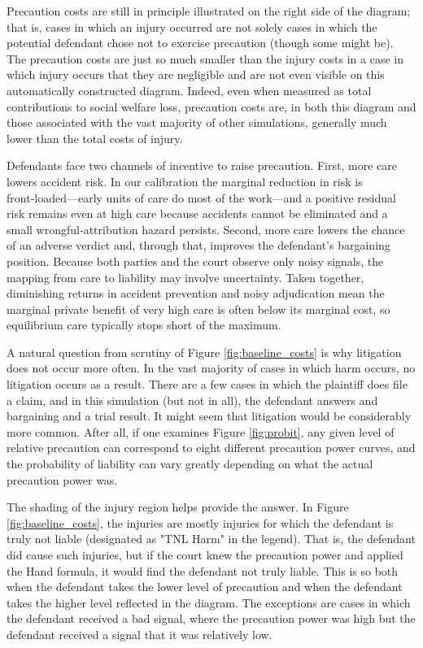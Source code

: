 \documentclass{article}
\begin{document}
Precaution costs are still in principle illustrated on the right side of the diagram; that is, cases in which an injury occurred are not solely cases in which the potential defendant chose not to exercise precaution (though some might be). The precaution costs are just so much smaller than the injury costs in a case in which injury occurs that they are negligible and are not even visible on this automatically constructed diagram. Indeed, even when measured as total contributions to social welfare loss, precaution costs are, in both this diagram and those associated with the vast majority of other simulations, generally much lower than the total costs of injury. 

Defendants face two channels of incentive to raise precaution. First, more care lowers accident risk. In our calibration the marginal reduction in risk is front‑loaded—early units of care do most of the work—and a positive residual risk remains even at high care because accidents cannot be eliminated and a small wrongful‑attribution hazard persists. Second, more care lowers the chance of an adverse verdict and, through that, improves the defendant’s bargaining position. Because both parties and the court observe only noisy signals, the mapping from care to liability may involve uncertainty. Taken together, diminishing returns in accident prevention and noisy adjudication mean the marginal private benefit of very high care is often below its marginal cost, so equilibrium care typically stops short of the maximum.

A natural question from scrutiny of Figure \ref{fig:baseline_costs} is why litigation does not occur more often. In the vast majority of cases in which harm occurs, no litigation occurs as a result. There are a few cases in which the plaintiff does file a claim, and in this simulation (but not in all), the defendant answers and bargaining and a trial result. It might seem that litigation would be considerably more common. After all, if one examines Figure \ref{fig:probit}, any given level of relative precaution can correspond to eight different precaution power curves, and the probability of liability can vary greatly depending on what the actual precaution power was. 

The shading of the injury region helps provide the answer. In Figure \ref{fig:baseline_costs},  the injuries are mostly injuries for which the defendant is truly not liable (designated as "TNL Harm" in the legend). That is, the defendant did cause such injuries, but if the court knew the precaution power and applied the Hand formula, it would find the defendant not truly liable. This is so both when the defendant takes the lower level of precaution and when the defendant takes the higher level reflected in the diagram. The exceptions are cases in which the defendant received a bad signal, where the precaution power was high but the defendant received a signal that it was relatively low. 
\end{document}
